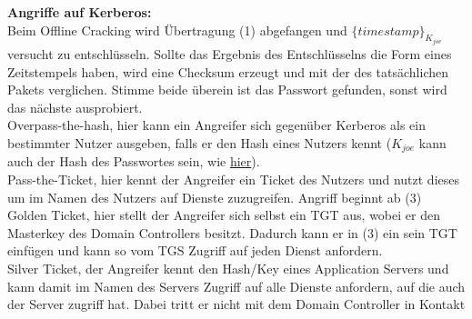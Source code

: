\documentclass[a4paper,12pt,leqno]{article}
\begin{document}
\textbf{Angriffe auf Kerberos:}\\

Beim Offline Cracking wird Übertragung (1) abgefangen und $\{timestamp\}_{K_{joe}}$ versucht zu entschlüsseln. Sollte das Ergebnis des Entschlüsselns die Form eines Zeitstempels haben, wird eine Checksum erzeugt und mit der des tatsächlichen Pakets verglichen. Stimme beide überein ist das Passwort gefunden, sonst wird das nächste ausprobiert.\\

Overpass-the-hash, hier kann ein Angreifer sich gegenüber Kerberos als ein bestimmter Nutzer ausgeben, falls er den Hash eines Nutzers kennt ($K_{joe}$ kann auch der Hash des Passwortes sein, wie \hyperref[figure:CHAP]{hier}).\\

Pass-the-Ticket, hier kennt der Angreifer ein Ticket des Nutzers und nutzt dieses um im Namen des Nutzers auf Dienste zuzugreifen. Angriff beginnt ab (3)\\

Golden Ticket, hier stellt der Angreifer sich selbst ein TGT aus, wobei er den Masterkey des Domain Controllers besitzt. Dadurch kann er in (3) ein sein TGT einfügen und kann so vom TGS Zugriff auf jeden Dienst anfordern.\\

Silver Ticket, der Angreifer kennt den Hash/Key eines Application Servers und kann damit im Namen des Servers Zugriff auf alle Dienste anfordern, auf die auch der Server zugriff hat.
Dabei tritt er nicht mit dem Domain Controller in Kontakt
\end{document}
